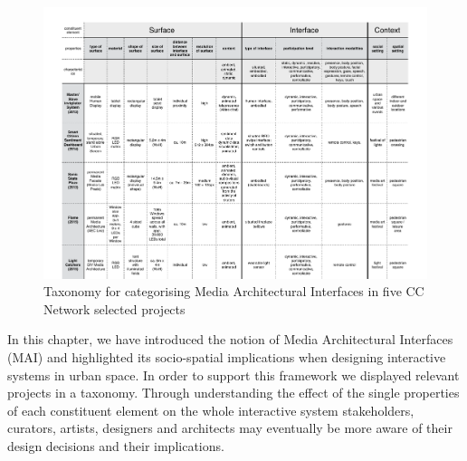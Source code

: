 \begin{figure}[htp]
\centering
\includegraphics[width=\textwidth]{Illustrations/CCN_Taxonomy.pdf}
\caption{Taxonomy for categorising Media Architectural Interfaces in five CC Network selected projects}
\label{fig:CCN_Taxonomy}
\end{figure}
In this chapter, we have introduced the notion of Media Architectural Interfaces (MAI) and highlighted its socio-spatial implications when designing interactive systems in urban space. In order to support this framework we displayed relevant projects in a taxonomy. 
Through understanding the effect of the single properties of each constituent element on the whole interactive system stakeholders, curators, artists, designers and architects may eventually be more aware of their design decisions and their implications.

